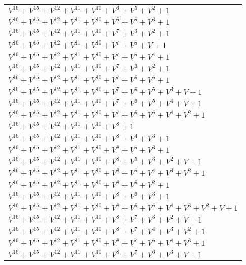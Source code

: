 \documentclass[12pt]{article}
\begin{document}
\begin{adjustwidth}{-4cm}{}
\begin{center}
\begin{longtable}{|l|}
$V^{16}  +V^{15}  +V^{12}  +V^{11}  +V^{10}  +V^{6}  +V^{5}  +V^{2}  + 1$ \\
$V^{16}  +V^{15}  +V^{12}  +V^{11}  +V^{10}  +V^{6}  +V^{5}  +V^{3}  + 1$ \\
$V^{16}  +V^{15}  +V^{12}  +V^{11}  +V^{10}  +V^{7}  +V^{3}  +V^{2}  + 1$ \\
$V^{16}  +V^{15}  +V^{12}  +V^{11}  +V^{10}  +V^{7}  +V^{5}  + V + 1$ \\
$V^{16}  +V^{15}  +V^{12}  +V^{11}  +V^{10}  +V^{7}  +V^{5}  +V^{4}  + 1$ \\
$V^{16}  +V^{15}  +V^{12}  +V^{11}  +V^{10}  +V^{7}  +V^{6}  +V^{2}  + 1$ \\
$V^{16}  +V^{15}  +V^{12}  +V^{11}  +V^{10}  +V^{7}  +V^{6}  +V^{5}  + 1$ \\
$V^{16}  +V^{15}  +V^{12}  +V^{11}  +V^{10}  +V^{7}  +V^{6}  +V^{5}  +V^{3}  + V + 1$ \\
$V^{16}  +V^{15}  +V^{12}  +V^{11}  +V^{10}  +V^{7}  +V^{6}  +V^{5}  +V^{4}  + V + 1$ \\
$V^{16}  +V^{15}  +V^{12}  +V^{11}  +V^{10}  +V^{7}  +V^{6}  +V^{5}  +V^{4}  +V^{2}  + 1$ \\
$V^{16}  +V^{15}  +V^{12}  +V^{11}  +V^{10}  +V^{8}  + 1$ \\
$V^{16}  +V^{15}  +V^{12}  +V^{11}  +V^{10}  +V^{8}  +V^{4}  +V^{3}  + 1$ \\
$V^{16}  +V^{15}  +V^{12}  +V^{11}  +V^{10}  +V^{8}  +V^{5}  +V^{3}  + 1$ \\
$V^{16}  +V^{15}  +V^{12}  +V^{11}  +V^{10}  +V^{8}  +V^{5}  +V^{3}  +V^{2}  + V + 1$ \\
$V^{16}  +V^{15}  +V^{12}  +V^{11}  +V^{10}  +V^{8}  +V^{5}  +V^{4}  +V^{3}  +V^{2}  + 1$ \\
$V^{16}  +V^{15}  +V^{12}  +V^{11}  +V^{10}  +V^{8}  +V^{6}  +V^{2}  + 1$ \\
$V^{16}  +V^{15}  +V^{12}  +V^{11}  +V^{10}  +V^{8}  +V^{6}  +V^{3}  + 1$ \\
$V^{16}  +V^{15}  +V^{12}  +V^{11}  +V^{10}  +V^{8}  +V^{6}  +V^{5}  +V^{4}  +V^{3}  +V^{2}  + V + 1$ \\
$V^{16}  +V^{15}  +V^{12}  +V^{11}  +V^{10}  +V^{8}  +V^{7}  +V^{3}  +V^{2}  + V + 1$ \\
$V^{16}  +V^{15}  +V^{12}  +V^{11}  +V^{10}  +V^{8}  +V^{7}  +V^{4}  +V^{3}  +V^{2}  + 1$ \\
$V^{16}  +V^{15}  +V^{12}  +V^{11}  +V^{10}  +V^{8}  +V^{7}  +V^{5}  +V^{4}  +V^{3}  + 1$ \\
$V^{16}  +V^{15}  +V^{12}  +V^{11}  +V^{10}  +V^{8}  +V^{7}  +V^{6}  +V^{3}  + V + 1$ \\

\end{longtable}
\end{center}
\end{adjustwidth}
\end{document}
